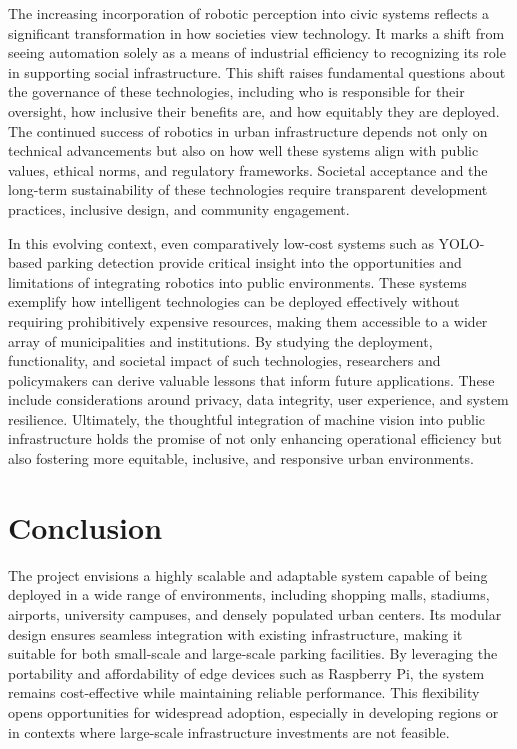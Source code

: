 \documentclass[conference]{IEEEtran}
\begin{document}
The increasing incorporation of robotic perception into civic systems reflects a significant transformation in how societies view technology. 
It marks a shift from seeing automation solely as a means of industrial efficiency to recognizing its role in supporting social infrastructure. 
This shift raises fundamental questions about the governance of these technologies, 
including who is responsible for their oversight, 
how inclusive their benefits are, 
and how equitably they are deployed. 
The continued success of robotics in urban infrastructure depends not only on technical advancements but also on how well these systems align with public values, 
ethical norms, 
and regulatory frameworks. 
Societal acceptance and the long-term sustainability of these technologies require transparent development practices, 
inclusive design, 
and community engagement.

In this evolving context, 
even comparatively low-cost systems such as YOLO-based parking detection provide critical insight into the opportunities and limitations of integrating robotics into public environments. 
These systems exemplify how intelligent technologies can be deployed effectively without requiring prohibitively expensive resources, 
making them accessible to a wider array of municipalities and institutions. 
By studying the deployment, 
functionality, 
and societal impact of such technologies, 
researchers and policymakers can derive valuable lessons that inform future applications. 
These include considerations around privacy, 
data integrity, 
user experience, 
and system resilience. 
Ultimately, 
the thoughtful integration of machine vision into public infrastructure holds the promise of not only enhancing operational efficiency but also fostering more equitable, 
inclusive, 
and responsive urban environments.



\section{Conclusion}

The project envisions a highly scalable and adaptable system capable of being deployed in a wide range of environments, 
including shopping malls, 
stadiums, 
airports, 
university campuses, 
and densely populated urban centers. 
Its modular design ensures seamless integration with existing infrastructure, 
making it suitable for both small-scale and large-scale parking facilities. 
By leveraging the portability and affordability of edge devices such as Raspberry Pi, 
the system remains cost-effective while maintaining reliable performance. 
This flexibility opens opportunities for widespread adoption, 
especially in developing regions or in contexts where large-scale infrastructure investments are not feasible.
\end{document}
